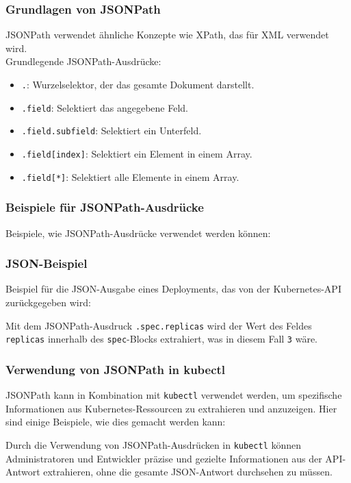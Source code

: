 \subsubsection{Grundlagen von JSONPath}
JSONPath verwendet ähnliche Konzepte wie XPath, das für XML verwendet wird.\\
Grundlegende JSONPath-Ausdrücke:

\begin{itemize}
    \item \texttt{.}: Wurzelselektor, der das gesamte Dokument darstellt.
    \item \texttt{.field}: Selektiert das angegebene Feld.
    \item \texttt{.field.subfield}: Selektiert ein Unterfeld.
    \item \texttt{.field[index]}: Selektiert ein Element in einem Array.
    \item \texttt{.field[*]}: Selektiert alle Elemente in einem Array.
\end{itemize}

\subsubsection{Beispiele für JSONPath-Ausdrücke}
Beispiele, wie JSONPath-Ausdrücke verwendet werden können:

\newpage
\subsubsection{JSON-Beispiel}
Beispiel für die JSON-Ausgabe eines Deployments, das von der Kubernetes-API zurückgegeben wird:

\noindent
Mit dem JSONPath-Ausdruck \texttt{.spec.replicas} wird der Wert des Feldes \texttt{replicas} innerhalb des \texttt{spec}-Blocks extrahiert, was in diesem Fall \texttt{3} wäre.
\newpage
\subsubsection{Verwendung von JSONPath in kubectl}
JSONPath kann in Kombination mit \texttt{kubectl} verwendet werden, um spezifische Informationen aus Kubernetes-Ressourcen zu extrahieren und anzuzeigen. Hier sind einige Beispiele, wie dies gemacht werden kann:


Durch die Verwendung von JSONPath-Ausdrücken in \texttt{kubectl} können Administratoren und Entwickler präzise und gezielte Informationen aus der API-Antwort extrahieren, ohne die gesamte JSON-Antwort durchsehen zu müssen.

